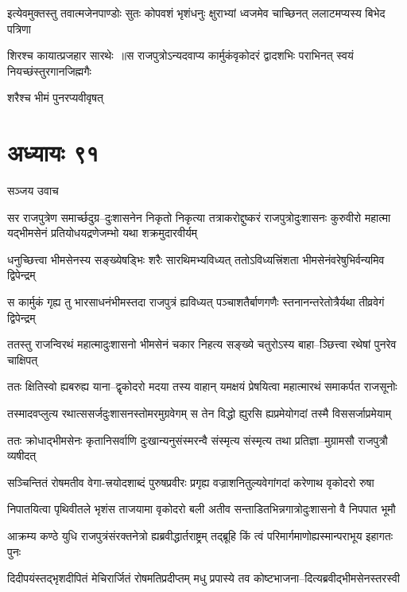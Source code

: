 \twolineshloka
{इत्येवमुक्तस्तु तवात्मजेनपाण्डोः सुतः कोपवशं भृशंधनुः क्षुराभ्यां ध्वजमेव चाच्छिनत्}
{ललाटमप्यस्य बिभेद पत्रिणा}


\twolineshloka
{शिरश्च कायात्प्रजहार सारथेः ॥स राजपुत्रोऽन्यदवाप्य कार्मुकंवृकोदरं द्वादशभिः पराभिनत्}
{स्वयं नियच्छंस्तुरगानजिह्मगैः}


शरैश्च भीमं पुनरप्यवीवृषत्
\chapter{अध्यायः ९१}
\twolineshloka
{सञ्जय उवाच}
{}


सर राजपुत्रेण समार्च्छदुग्र--दुःशासनेन निकृतो निकृत्या
\twolineshloka
{तत्राकरोद्दुष्करं राजपुत्रोदुःशासनः कुरुवीरो महात्मा}
{यद्भीमसेनं प्रतियोधयद्रणेजम्भो यथा शक्रमुदारवीर्यम्}


\twolineshloka
{धनुच्छित्त्वा भीमसेनस्य सङ्ख्येषड्भिः शरैः सारथिमभ्यविध्यत्}
{ततोऽविध्यत्त्रिंशता भीमसेनंवरेषुभिर्वन्यमिव द्विपेन्द्रम्}


\twolineshloka
{स कार्मुकं गृह्य तु भारसाधनंभीमस्तदा राजपुत्रं ह्यविध्यत्}
{पञ्चाशतैर्बाणगणैः स्तनानन्तरेतोत्रैर्यथा तीव्रवेगं द्विपेन्द्रम्}


\twolineshloka
{ततस्तु राजन्विरथं महात्मादुःशासनो भीमसेनं चकार}
{निहत्य सङ्ख्ये चतुरोऽस्य बाहा--ञ्छित्त्वा रथेषां पुनरेव चाक्षिपत्}


\twolineshloka
{ततः क्षितिस्वो ह्यबरुह्य याना--द्वृकोदरो मदया तस्य वाहान्}
{यमक्षयं प्रेषयित्वा महात्मारथं समाकर्पत राजसूनोः}


\twolineshloka
{तस्मादवप्लुत्य रथात्ससर्जदुःशासनस्तोमरमुग्रवेगम्}
{स तेन विद्धो ह्युरसि ह्यप्रमेयोगदां तस्मै विससर्जाप्रमेयाम्}


\twolineshloka
{ततः क्रोधाद्भीमसेनः कृतानिसर्वाणि दुःखान्यनुसंस्मरन्वै}
{संस्मृत्य संस्मृत्य तथा प्रतिज्ञा--मुग्रामसौ राजपुत्रौ व्यषीदत्}


\twolineshloka
{सञ्चिन्तितं रोषमतीव वेगा-त्त्रयोदशाब्दं पुरुषप्रवीरः}
{प्रगृह्य वज्राशनितुल्यवेगांगदां करेणाथ वृकोदरो रुषा}


\twolineshloka
{निपातयित्वा पृथिवीतले भृशंस ताजयामा वृकोदरो बली}
{अतीव सन्ताडितभिन्नगात्रोदुःशासनो वै निपपात भूमौ}


\twolineshloka
{आक्रम्य कण्ठे युधि राजपुत्रंसंरक्तनेत्रो ह्यब्रवीद्धार्तराष्ट्रम्}
{तद्ब्रूहि किं त्वं परिमार्गमाणोह्यस्मान्पराभूय इहागतः पुनः}


\twolineshloka
{दिदीपयंस्तद्भृशदीपितं मेचिरार्जितं रोषमतिप्रदीप्तम्}
{मधु प्रपास्ये तव कोष्टभाजना--दित्यब्रवीद्भीमसेनस्तरस्वी}



